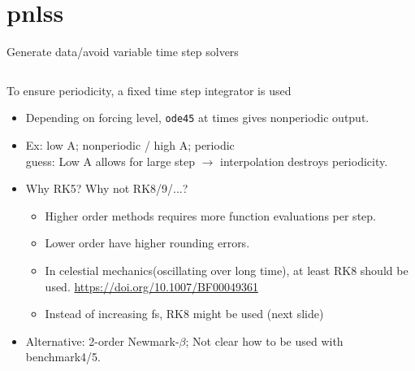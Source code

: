 \documentclass[9pt]{beamer}
\begin{document}
\section{pnlss}
\label{sec:generate-data}

\begin{frame}{Generate data/avoid variable time step solvers}
  \begin{columns}
    \begin{column}{0.5\textwidth}
      To ensure periodicity, a fixed time step integrator is used
      \begin{itemize}
      \item Depending on forcing level, \texttt{ode45} at times gives nonperiodic
        output.
      \item Ex: low A; nonperiodic / high A; periodic\\
        guess: Low A allows for large step $\rightarrow$ interpolation destroys
        periodicity.
      \item Why RK5? Why not RK8/9/...?
        \begin{itemize}
        \item Higher order methods requires more function evaluations per step.
        \item Lower order have higher rounding errors.\\
        \item In celestial mechanics(oscillating over long time), at least RK8
          should be used. \url{https://doi.org/10.1007/BF00049361}
        \item Instead of increasing fs, RK8 might be used (next slide)
        \end{itemize}
      \item Alternative: 2-order Newmark-$\beta$; Not clear how to be used with
        benchmark4/5.
      \end{itemize}


\end{column}
\end{columns}
\end{frame}
\end{document}

